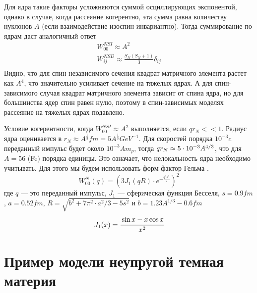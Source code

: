 Для ядра такие факторы усложняются суммой осциллирующих экспонентой, однако в случае, когда рассеяние когерентно, эта сумма равна количеству нуклонов $A$ (если взаимодействие изоспин-инвариантно). Тогда суммирование по ядрам даст аналогичный ответ
\begin{equation}
	\begin{split}
		W^{N SI}_{00} \approx A^2 \\ 
		W^{N SD}_{ij} \approx \frac{S_{N}(S_{N}+1)}{3} \delta_{ij} \\
	\end{split}
\end{equation}
Видно, что для спин-независимого сечения квадрат матричного элемента растет как $A^4$, что значительно усиливает сечение на тяжелых ядрах. А для спин-зависимого случая квадрат матричного элемента зависит от спина ядра, но для большинства ядер спин равен нулю, поэтому в спин-зависимых моделях рассеяние на тяжелых ядрах подавлено.

Условие когерентности, когда $W^{N SI}_{00} \approx A^2$ выполняется, если $q r_N << 1$. Радиус ядра оценивается в $r_N \approx A^{\frac{1}{3}} fm = 5 A^{\frac{1}{3}} GeV^{-1}$. Для скоростей порядка $10^{-3} c$ переданный импульс будет около $10^{-3}A m_p$, тогда $qr_N \approx {5}\cdot 10^{-3}A^{4/3}$, что для $A=56$ (Fe) порядка единицы. Это означает, что нелокальность ядра необходимо учитывать. Для этого мы будем использовать форм-фактор Гельма \cite{D_da_2007}.
\begin{equation}
	\label{eq:form_factor}
	W^N_{00}(q) = \left(3J_1(qR)\cdot e^{-\frac{q^2s^2}{2}}\right)^2
\end{equation}
где $q$ --- это переданный импульс, $J_1$ --- сферическая функция Бесселя, $s = 0.9 fm$, $a = 0.52 fm$, $R = \sqrt{b^2+7\pi^2\cdot a^2/3-5s^2}$ и $b = 1.23 A^{1/3} - 0.6 fm$
\begin{equation}
	J_1(x) = \cfrac{\sin{x}-x \cos{x}}{x^2} 
\end{equation}


\section{Пример модели неупругой темная материя}

